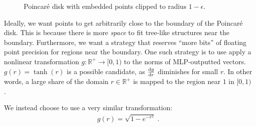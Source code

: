 \documentclass{article}
\begin{document}
\begin{figure}[ht]
  \centering
  \caption{Poincaré disk with embedded points clipped to radius $1 - \epsilon$.}
  \label{fig:poincare-disk-epsilon}
\end{figure}

Ideally, we want points to get arbitrarily close to the boundary of the Poincaré disk. This is because there is more \emph{space} to fit tree-like structures near the boundary. Furthermore, we want a strategy that reserves ``more bits'' of floating point precision for regions near the boundary. One such strategy is to use apply a nonlinear transformation $g: \mathbb R^+ \to [0, 1)$ to the norms of MLP-outputted vectors. $g(r) = \tanh(r)$ is a possible candidate, as $\dv{g}{r}$ diminishes for small $r$. In other words, a large share of the domain $r \in \mathbb R^+$ is mapped to the region near $1$ in $[0, 1)$.

We instead choose to use a very similar transformation:
\begin{align}
  g(r) = \sqrt{1 - e^{-r^2}} \; . \label{eq:radial-transformation}
\end{align}
\end{document}
